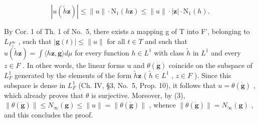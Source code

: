 \[
\left| u \left(\widetilde {h} \mathbf {z}\right) \right| \leqslant \| u \| \cdot \mathrm{N} _ {1} (h \mathbf {z}) \leqslant \| u \| \cdot | \mathbf {z} | \cdot \mathrm{N} _ {1} (h).
\]

By Cor. 1 of Th. 1 of No.~5, there exists a mapping g of T into F', belonging to \(L_{F_{s}^{\infty}}\) , such that \(|\mathbf{g}(t)| \leqslant \|u\|\) for all \(t \in T\) and such that \(u(\widetilde{h}\mathbf{z}) = \int \langle h\mathbf{z}, \mathbf{g} \rangle d\mu\) for every function \(h \in L^{1}\) with class \(\widetilde{h}\) in \(L^{1}\) and every \(z \in F\) . In other words, the linear forms u and \(\theta(\dot{\mathbf{g}})\) coincide on the subspace of \(L_{F}^{1}\) generated by the elements of the form \(\widetilde{h}\mathbf{z}\) ( \(\widetilde{h} \in L^{1}\) , \(z \in F\) ). Since this subspace is dense in \(L_{F}^{1}\) (Ch. IV, §3, No.~5, Prop. 10), it follows that \(u = \theta(\dot{\mathbf{g}})\) , which already proves that \(\theta\) is surjective. Moreover, by (3), \(\|\theta(\dot{\mathbf{g}})\| \leqslant N_{\infty}(\mathbf{g}) \leqslant \|u\| = \|\theta(\dot{\mathbf{g}})\|\) , whence \(\|\theta(\dot{\mathbf{g}})\| = N_{\infty}(\mathbf{g})\) , and this concludes the proof.
